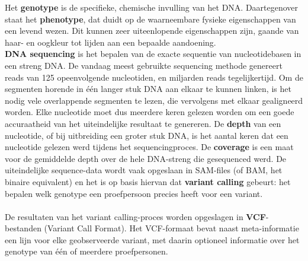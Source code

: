 Het \textbf{genotype} is de specifieke, chemische invulling van het DNA. Daartegenover staat het \textbf{phenotype}, dat duidt op de waarneembare fysieke eigenschappen van een levend wezen. Dit kunnen zeer uiteenlopende eigenschappen zijn, gaande van haar- en oogkleur tot lijden aan een bepaalde aandoening.\\

\textbf{DNA sequencing} is het bepalen van de exacte sequentie van nucleotidebasen in een streng DNA. De vandaag meest gebruikte sequencing methode genereert reads van 125 opeenvolgende nucleotiden, en miljarden reads tegelijkertijd. Om de segmenten horende in \'e\'en langer stuk DNA aan elkaar te kunnen linken, is het nodig vele overlappende segmenten te lezen, die vervolgens met elkaar gealigneerd worden. Elke nucleotide moet dus meerdere keren gelezen worden om een goede accuraatheid van het uiteindelijke resultaat te genereren. De \textbf{depth} van een nucleotide, of bij uitbreiding een groter stuk DNA, is het aantal keren dat een nucleotide gelezen werd tijdens het sequencingproces. De \textbf{coverage} is een maat voor de gemiddelde depth over de hele DNA-streng die gesequenced werd. De uiteindelijke sequence-data wordt vaak opgeslaan in SAM-files (of BAM, het binaire equivalent) en het is op basis hiervan dat \textbf{variant calling} gebeurt: het bepalen welk genotype een proefpersoon precies heeft voor een variant.\\\\
De resultaten van het variant calling-proces worden opgeslagen in \textbf{VCF}-bestanden (Variant Call Format). Het VCF-formaat bevat naast meta-informatie een lijn voor elke geobserveerde variant, met daarin optioneel informatie over het genotype van \'e\'en of meerdere proefpersonen. 